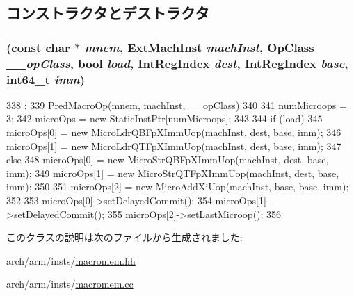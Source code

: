 \subsection{コンストラクタとデストラクタ}
\hypertarget{classArmISA_1_1BigFpMemPreOp_af22fb1c31af1287c19c29bb9e5b5628d}{
\subsubsection[{BigFpMemPreOp}]{ (const char $\ast$ {\em mnem}, \/  {\bf ExtMachInst} {\em machInst}, \/  OpClass {\em \_\-\_\-opClass}, \/  bool {\em load}, \/  {\bf IntRegIndex} {\em dest}, \/  {\bf IntRegIndex} {\em base}, \/  int64\_\-t {\em imm})}}
\label{classArmISA_1_1BigFpMemPreOp_af22fb1c31af1287c19c29bb9e5b5628d}



\begin{DoxyCode}
338                                                             :
339     PredMacroOp(mnem, machInst, __opClass)
340 {
341     numMicroops = 3;
342     microOps = new StaticInstPtr[numMicroops];
343 
344     if (load) {
345         microOps[0] = new MicroLdrQBFpXImmUop(machInst, dest, base, imm);
346         microOps[1] = new MicroLdrQTFpXImmUop(machInst, dest, base, imm);
347     } else {
348         microOps[0] = new MicroStrQBFpXImmUop(machInst, dest, base, imm);
349         microOps[1] = new MicroStrQTFpXImmUop(machInst, dest, base, imm);
350     }
351     microOps[2] = new MicroAddXiUop(machInst, base, base, imm);
352 
353     microOps[0]->setDelayedCommit();
354     microOps[1]->setDelayedCommit();
355     microOps[2]->setLastMicroop();
356 }

\end{DoxyCode}


このクラスの説明は次のファイルから生成されました:\begin{DoxyCompactItemize}
\item 
arch/arm/insts/\hyperlink{macromem_8hh}{macromem.hh}\item 
arch/arm/insts/\hyperlink{macromem_8cc}{macromem.cc}\end{DoxyCompactItemize}
